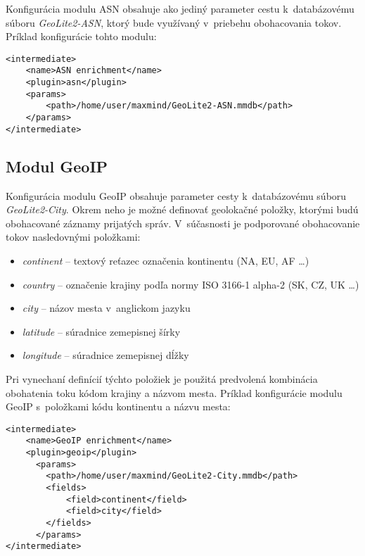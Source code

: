 Konfigurácia modulu ASN obsahuje ako jediný parameter cestu k~databázovému súboru \textit{GeoLite2-ASN}, ktorý bude využívaný v~priebehu obohacovania tokov. Príklad konfigurácie tohto modulu:

\begin{lstlisting}
<intermediate>
    <name>ASN enrichment</name>
    <plugin>asn</plugin>
    <params>
        <path>/home/user/maxmind/GeoLite2-ASN.mmdb</path>
    </params>
</intermediate>
\end{lstlisting}

\subsection*{Modul GeoIP}

Konfigurácia modulu GeoIP obsahuje parameter cesty k~databázovému súboru \textit{GeoLite2-City}. Okrem neho je možné definovať geolokačné položky, ktorými budú obohacované záznamy prijatých správ.
V~súčasnosti je podporované obohacovanie tokov nasledovnými položkami:

\begin{itemize}
    \setlength\itemsep{-0.5em}
    \item \textit{continent} -- textový reťazec označenia kontinentu (NA, EU, AF \ldots)
    \item \textit{country} -- označenie krajiny podľa normy ISO 3166-1 alpha-2 (SK, CZ, UK \ldots)
    \item \textit{city} -- názov mesta v~anglickom jazyku
    \item \textit{latitude} -- súradnice zemepisnej šírky
    \item \textit{longitude} -- súradnice zemepisnej dĺžky
\end{itemize}

Pri vynechaní definícií týchto položiek je použitá predvolená kombinácia obohatenia toku kódom krajiny a názvom mesta. Príklad konfigurácie modulu GeoIP s~položkami kódu kontinentu a názvu mesta:

\begin{lstlisting}
<intermediate>
    <name>GeoIP enrichment</name>
    <plugin>geoip</plugin>
      <params>
        <path>/home/user/maxmind/GeoLite2-City.mmdb</path>
        <fields>
            <field>continent</field>
            <field>city</field>
        </fields>
      </params>
</intermediate>
\end{lstlisting}